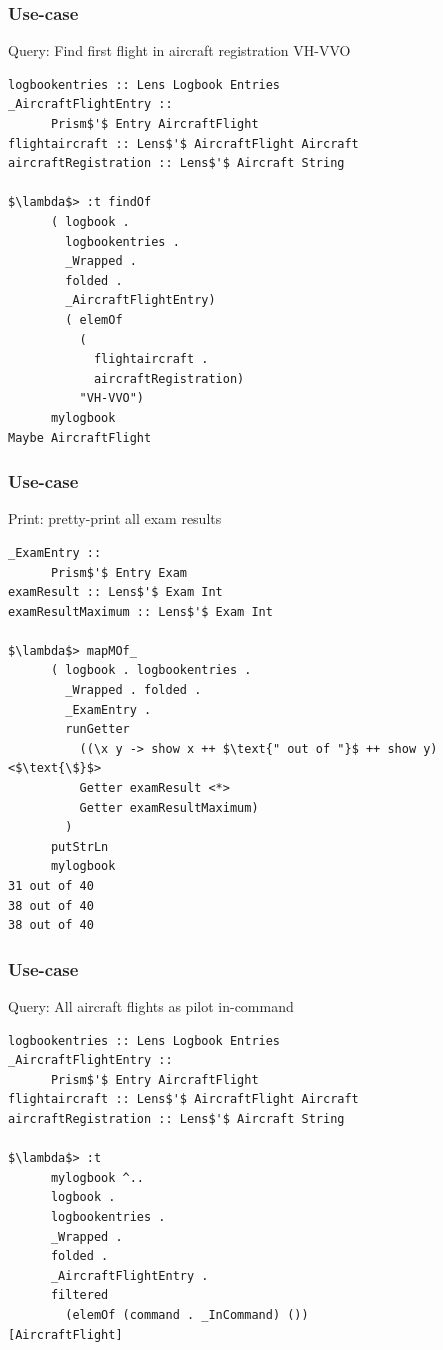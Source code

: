 \begin{frame}[fragile]
\frametitle{Use-case}
\begin{block}{Query: Find first flight in aircraft registration VH-VVO}
\begin{lstlisting}[style=haskell,basicstyle=\scriptsize\ttfamily,mathescape]
logbookentries :: Lens Logbook Entries
_AircraftFlightEntry ::
      Prism$'$ Entry AircraftFlight
flightaircraft :: Lens$'$ AircraftFlight Aircraft
aircraftRegistration :: Lens$'$ Aircraft String

$\lambda$> :t findOf
      ( logbook . 
        logbookentries . 
        _Wrapped . 
        folded . 
        _AircraftFlightEntry)
        ( elemOf
          (
            flightaircraft . 
            aircraftRegistration)
          "VH-VVO")
      mylogbook
Maybe AircraftFlight
\end{lstlisting}
\end{block}
\end{frame}

\begin{frame}[fragile]
\frametitle{Use-case}
\begin{block}{Print: pretty-print all exam results}
\begin{lstlisting}[style=haskell,basicstyle=\scriptsize\ttfamily,mathescape]
_ExamEntry ::
      Prism$'$ Entry Exam
examResult :: Lens$'$ Exam Int
examResultMaximum :: Lens$'$ Exam Int

$\lambda$> mapMOf_
      ( logbook . logbookentries .
        _Wrapped . folded .
        _ExamEntry .
        runGetter
          ((\x y -> show x ++ $\text{" out of "}$ ++ show y) <$\text{\$}$>
          Getter examResult <*>
          Getter examResultMaximum)
        )
      putStrLn
      mylogbook
31 out of 40
38 out of 40
38 out of 40
\end{lstlisting}
\end{block}
\end{frame}

\begin{frame}[fragile]
\frametitle{Use-case}
\begin{block}{Query: All aircraft flights as pilot in-command}
\begin{lstlisting}[style=haskell,basicstyle=\scriptsize\ttfamily,mathescape]
logbookentries :: Lens Logbook Entries
_AircraftFlightEntry ::
      Prism$'$ Entry AircraftFlight
flightaircraft :: Lens$'$ AircraftFlight Aircraft
aircraftRegistration :: Lens$'$ Aircraft String

$\lambda$> :t
      mylogbook ^..
      logbook .
      logbookentries .
      _Wrapped .
      folded .
      _AircraftFlightEntry .
      filtered
        (elemOf (command . _InCommand) ())
[AircraftFlight]
\end{lstlisting}
\end{block}
\end{frame}


